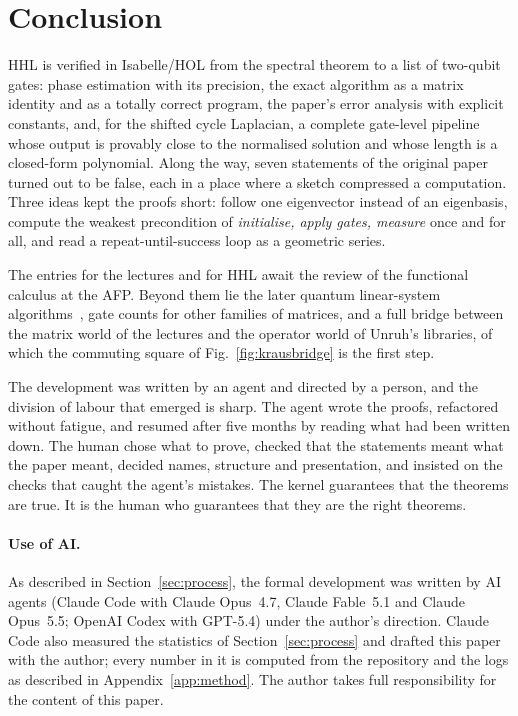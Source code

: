 \section{Conclusion}\label{sec:conclusion}

HHL is verified in Isabelle/HOL from the spectral theorem to a list of two-qubit gates: phase
estimation with its precision, the exact algorithm as a matrix identity and as a totally correct
program, the paper's error analysis with explicit constants, and, for the shifted cycle Laplacian, a
complete gate-level pipeline whose output is provably close to the normalised solution and whose length
is a closed-form polynomial. Along the way, seven statements of the original paper turned out to be
false, each in a place where a sketch compressed a computation. Three ideas kept the proofs short:
follow one eigenvector instead of an eigenbasis, compute the weakest precondition of
\emph{initialise, apply gates, measure} once and for all, and read a repeat-until-success loop as a
geometric series.

The entries for the lectures and for HHL await the review of the functional calculus at the AFP.
Beyond them lie the later quantum linear-system algorithms~\cite{childs2017}, gate counts for other
families of matrices, and a full bridge between the matrix world of the lectures and the operator world
of Unruh's libraries, of which the commuting square of Fig.~\ref{fig:krausbridge} is the first step.

The development was written by an agent and directed by a person, and the division of labour that
emerged is sharp. The agent wrote the proofs, refactored without fatigue, and resumed after five months
by reading what had been written down. The human chose what to prove, checked that the statements meant
what the paper meant, decided names, structure and presentation, and insisted on the checks that caught
the agent's mistakes. The kernel guarantees that the theorems are true. It is the human who guarantees
that they are the right theorems.

\paragraph{Use of AI.} As described in Section~\ref{sec:process}, the formal development was written
by AI agents (Claude Code with Claude Opus~4.7, Claude Fable~5.1 and Claude Opus~5.5; OpenAI Codex with
GPT-5.4) under the author's direction. Claude Code also measured the statistics of Section~\ref{sec:process}
and drafted this paper with the author; every number in it is computed from the repository and the
logs as described in Appendix~\ref{app:method}. The author takes full responsibility for the content of
this paper.
